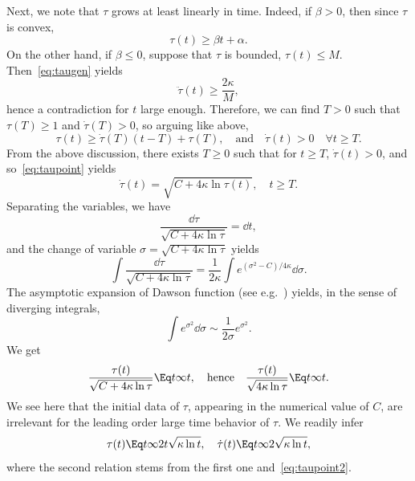 Next, we note that $\tau$ grows at least linearly in time. Indeed, if $\beta>0$, then since $\tau$ is convex,
\begin{equation*}
\tau(t)\ge \beta t+\alpha.
\end{equation*}
On the other hand, if $\beta\le 0$, suppose that $\tau$ is bounded, $\tau(t)\le M$. Then~\eqref{eq:taugen} yields
\begin{equation*}
\ddot \tau(t)\ge \frac{2\kappa}{M},
\end{equation*}
hence a contradiction for $t$ large enough. Therefore, we can find $T>0$ such that $\tau(T)\ge 1$ and $\dot \tau(T)>0$, so arguing like above,
\begin{equation*}
\tau(t)\ge \dot\tau(T)(t-T)+\tau(T),\quad \text{and}\quad \dot
\tau(t)>0\quad \forall t\ge T.
\end{equation*}
From the above discussion, there exists $T\ge 0$ such that for $t\ge T$, $\dot \tau(t)>0$, and so~\eqref{eq:taupoint} yields
\begin{equation}\label{eq:taupoint2}
\dot \tau(t) = \sqrt{C+4\kappa \ln \tau(t)},\quad t\ge T.
\end{equation}
Separating the variables, we have
\begin{equation*}
\frac{\dd \tau}{\sqrt{C+4\kappa \ln \tau}}=\dd t,
\end{equation*}
and the change of variable $\sigma= \sqrt{C+4\kappa \ln \tau}$ yields
\begin{equation*}
\int \frac{\dd \tau}{\sqrt{C+4\kappa \ln \tau}} =
\frac{1}{2\kappa}\int e^{(\sigma^2-C)/4\kappa}\dd \sigma.
\end{equation*}
The asymptotic expansion of Dawson function (see e.g.~\cite{AbSt64}) yields, in the sense of diverging integrals,
\begin{equation*}
\int e^{\sigma^2}\dd \sigma \sim \frac{1}{2\sigma}e^{\sigma^2}.
\end{equation*}
We get
\begin{equation*}
\frac{\tau(t)}{\sqrt{C+4\kappa \ln \tau}}\Eq t \infty t,\quad
\text{hence}\quad
\frac{\tau(t)}{\sqrt{4\kappa \ln \tau}}\Eq t \infty t.
\end{equation*}
We see here that the initial data of $\tau$, appearing in the numerical value of $C$, are irrelevant for the leading order large time behavior of $\tau$. We readily infer
\begin{equation*}
\tau(t)\Eq t \infty 2t\sqrt{\kappa \ln t},\quad \dot \tau(t) \Eq t
\infty 2\sqrt{\kappa \ln t},
\end{equation*}
where the second relation stems from the first one and~\eqref{eq:taupoint2}.

